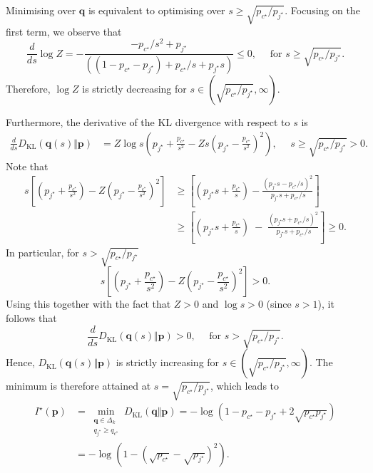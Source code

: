    Minimising over $\mathbf q$ is equivalent to optimising over $s \geq \sqrt{p_{c^\star}/p_{j^\star}}$.   
    Focusing on the first term, we observe that
    $$
    \frac{d}{ds}\log Z = -\frac{-p_{c^\star}/s^2 + p_{j^\star}}{\left((1 - p_{c^\star} - p_{j^\star}) + p_{c^\star}/s + p_{j^\star}s\right)} \leq 0, \quad\mbox{ for } s \geq \sqrt{p_{c^\star}/p_{j^\star}}.
    $$
    Therefore, $\log Z$ is strictly decreasing for $s\in\left(\sqrt{p_{c^\star}/p_{j^\star}}, \infty\right)$. 

Furthermore, the derivative of the KL divergence with respect to $s$ is
\begin{align*}
\frac{d}{ds}D_{\text{KL}}(\mathbf{q}(s)\Vert \mathbf{p} ) &= Z \log s\left(p_{j^\star}  + \frac{p_{c^\star}}{s^2} -Zs\left(p_{j^\star}-\frac{p_{c^\star}}{s^2}\right)^2\right), \quad\,\, s \geq \sqrt{p_{c^\star}/p_{j^\star}}> 0.
\end{align*}
Note that 
\begin{align*}
 s\left[\left(p_{j^\star}+\frac{p_{c^\star}}{s^{2}}\right)
- Z\left(p_{j^\star}-\frac{p_{c^\star}}{s^2}\right)^2
\right] &\geq \left[\left(p_{j^\star}s+\frac{p_{c^\star}}{s}\right)
-
\frac{(p_{j^\star} s-p_{c^\star}/s)^{2}}{\,p_{j^\star} s + {p_{c^\star}}/{s}}
\right] \\&\geq \left[\left(p_{j^\star}s+\frac{p_{c^\star}}{s}\right)
\;-\;
\frac{(p_{j^\star} s+p_{c^\star}/s)^{2}}{\,p_{j^\star} s + p_{c^\star}/s}
\right]  \geq 0.
\end{align*}
In particular, for $s>\sqrt{p_{c^\star}/p_{j^\star}}$
$$
 s\left[\left(p_{j^\star}+\frac{p_{c^\star}}{s^{2}}\right)
- Z\left(p_{j^\star}-\frac{p_{c^\star}}{s^2}\right)^2
\right] >0.
$$
Using this together with the fact that $Z>0$ and $\log s>0$ (since $s> 1$), it follows that
$$
\frac{d}{ds}D_{\text{KL}}(\mathbf{q}(s)\Vert \mathbf{p} )>0, \quad\mbox{ for } s > \sqrt{p_{c^\star}/p_{j^\star}}.
$$
Hence, $D_{\text{KL}}(\mathbf{q}(s)\Vert \mathbf{p} )$ is strictly increasing for $s\in(\sqrt{p_{c^\star}/p_{j^\star}}, \infty)$. The minimum is therefore attained at $s = \sqrt{p_{c^\star}/p_{j^\star}}$, which leads to
\begin{align*}
I^\star(\mathbf{p}) &=\min_{\substack{\mathbf{q}\in\Delta_k\\q_{j^\star}\ge q_{c^\star}}} 
D_{\text{KL}}(\mathbf{q}\Vert \mathbf{p})
=-\log \left(1-p_{c^\star}-p_{j^\star}+2\sqrt{p_{c^\star} p_{j^\star}}\right) \\
&= -\log\left(1-\left(\sqrt{p_{c^\star}}-\sqrt{p_{j^\star}}\right)^2\right).
\end{align*}

